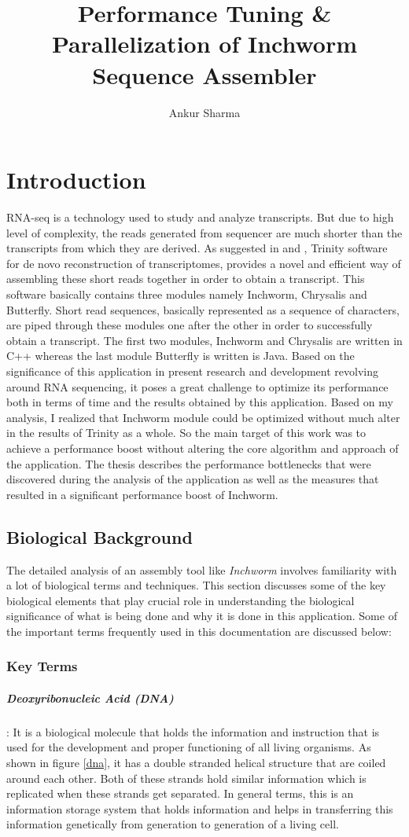 \label{key}\documentclass[bachinf, english ,zihtitle,final,hyperref,utf8]{zihpub}
\author{Ankur Sharma}
\title{Performance Tuning \& Parallelization of Inchworm Sequence Assembler}
\begin{document}
\listoffigures

\newpage
\chapter{Introduction} 
RNA-seq is a technology used to study and analyze transcripts. But due to high level of complexity, the reads generated from sequencer are much shorter than the transcripts from which they are derived. As suggested in \cite{trinitynew} and \cite{Trinity}, Trinity software for de novo reconstruction of transcriptomes, provides a novel and efficient way of assembling these short reads together in order to obtain a transcript. This software basically contains three modules namely Inchworm, Chrysalis and Butterfly. Short read sequences, basically represented as a sequence of characters, are piped through these modules one after the other in order to successfully obtain a transcript. The first two modules, Inchworm and Chrysalis are written in C++ whereas the last module Butterfly is written is Java. Based on the significance of this application in present research and development revolving around RNA sequencing, it poses a great challenge to optimize its performance both in terms of time and the results obtained by this application. Based on my analysis, I realized that Inchworm module could be optimized without much alter in the results of Trinity as a whole. So the main target of this work was to achieve a performance boost  without altering the core algorithm and approach of the application. The thesis describes the performance bottlenecks that were discovered during the analysis of the application as well as the measures that resulted in a significant performance boost of Inchworm.
\section{Biological Background}
The detailed analysis of  an assembly tool like \emph{Inchworm} involves familiarity with a lot of biological terms and techniques. This section discusses some of the key biological elements that play crucial role in understanding the biological significance of what is being done and why it is done in this application. Some of the important terms frequently used in this documentation are discussed below:
\subsection{Key Terms}
\paragraph{Deoxyribonucleic Acid (DNA)}: It is a biological molecule that holds the information and instruction that is used for the development and proper functioning of all living organisms. As shown in figure \ref{dna}, it has a double stranded helical structure that are coiled around each other. Both of these strands hold similar information which is replicated when these strands get separated. In general terms, this is an information storage system that holds information and helps in transferring this information genetically from generation to generation of a living cell.
\end{document}
